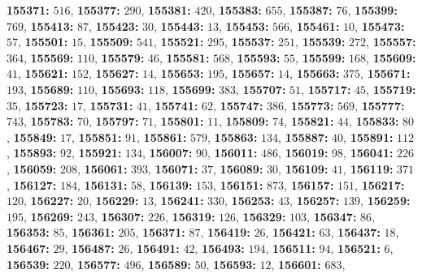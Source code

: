 \textsf{\bfseries 155371:} $516$, \textsf{\bfseries 155377:} $290$, \textsf{\bfseries 155381:} $420$, \textsf{\bfseries 155383:} $655$, \textsf{\bfseries 155387:} $76$, \textsf{\bfseries 155399:} $769$, \textsf{\bfseries 155413:} $87$, \textsf{\bfseries 155423:} $30$, \textsf{\bfseries 155443:} $13$, \textsf{\bfseries 155453:} $566$, \textsf{\bfseries 155461:} $10$, \textsf{\bfseries 155473:} $57$, \textsf{\bfseries 155501:} $15$, \textsf{\bfseries 155509:} $541$, \textsf{\bfseries 155521:} $295$, \textsf{\bfseries 155537:} $251$, \textsf{\bfseries 155539:} $272$, \textsf{\bfseries 155557:} $364$, \textsf{\bfseries 155569:} $110$, \textsf{\bfseries 155579:} $46$, \textsf{\bfseries 155581:} $568$, \textsf{\bfseries 155593:} $55$, \textsf{\bfseries 155599:} $168$, \textsf{\bfseries 155609:} $41$, \textsf{\bfseries 155621:} $152$, \textsf{\bfseries 155627:} $14$, \textsf{\bfseries 155653:} $195$, \textsf{\bfseries 155657:} $14$, \textsf{\bfseries 155663:} $375$, \textsf{\bfseries 155671:} $193$, \textsf{\bfseries 155689:} $110$, \textsf{\bfseries 155693:} $118$, \textsf{\bfseries 155699:} $383$, \textsf{\bfseries 155707:} $51$, \textsf{\bfseries 155717:} $45$, \textsf{\bfseries 155719:} $35$, \textsf{\bfseries 155723:} $17$, \textsf{\bfseries 155731:} $41$, \textsf{\bfseries 155741:} $62$, \textsf{\bfseries 155747:} $386$, \textsf{\bfseries 155773:} $569$, \textsf{\bfseries 155777:} $743$, \textsf{\bfseries 155783:} $70$, \textsf{\bfseries 155797:} $71$, \textsf{\bfseries 155801:} $11$, \textsf{\bfseries 155809:} $74$, \textsf{\bfseries 155821:} $44$, \textsf{\bfseries 155833:} $80$, \textsf{\bfseries 155849:} $17$, \textsf{\bfseries 155851:} $91$, \textsf{\bfseries 155861:} $579$, \textsf{\bfseries 155863:} $134$, \textsf{\bfseries 155887:} $40$, \textsf{\bfseries 155891:} $112$, \textsf{\bfseries 155893:} $92$, \textsf{\bfseries 155921:} $134$, \textsf{\bfseries 156007:} $90$, \textsf{\bfseries 156011:} $486$, \textsf{\bfseries 156019:} $98$, \textsf{\bfseries 156041:} $226$, \textsf{\bfseries 156059:} $208$, \textsf{\bfseries 156061:} $393$, \textsf{\bfseries 156071:} $37$, \textsf{\bfseries 156089:} $30$, \textsf{\bfseries 156109:} $41$, \textsf{\bfseries 156119:} $371$, \textsf{\bfseries 156127:} $184$, \textsf{\bfseries 156131:} $58$, \textsf{\bfseries 156139:} $153$, \textsf{\bfseries 156151:} $873$, \textsf{\bfseries 156157:} $151$, \textsf{\bfseries 156217:} $120$, \textsf{\bfseries 156227:} $20$, \textsf{\bfseries 156229:} $13$, \textsf{\bfseries 156241:} $330$, \textsf{\bfseries 156253:} $43$, \textsf{\bfseries 156257:} $139$, \textsf{\bfseries 156259:} $195$, \textsf{\bfseries 156269:} $243$, \textsf{\bfseries 156307:} $226$, \textsf{\bfseries 156319:} $126$, \textsf{\bfseries 156329:} $103$, \textsf{\bfseries 156347:} $86$, \textsf{\bfseries 156353:} $85$, \textsf{\bfseries 156361:} $205$, \textsf{\bfseries 156371:} $87$, \textsf{\bfseries 156419:} $26$, \textsf{\bfseries 156421:} $63$, \textsf{\bfseries 156437:} $18$, \textsf{\bfseries 156467:} $29$, \textsf{\bfseries 156487:} $26$, \textsf{\bfseries 156491:} $42$, \textsf{\bfseries 156493:} $194$, \textsf{\bfseries 156511:} $94$, \textsf{\bfseries 156521:} $6$, \textsf{\bfseries 156539:} $220$, \textsf{\bfseries 156577:} $496$, \textsf{\bfseries 156589:} $50$, \textsf{\bfseries 156593:} $12$, \textsf{\bfseries 156601:} $683$, 
